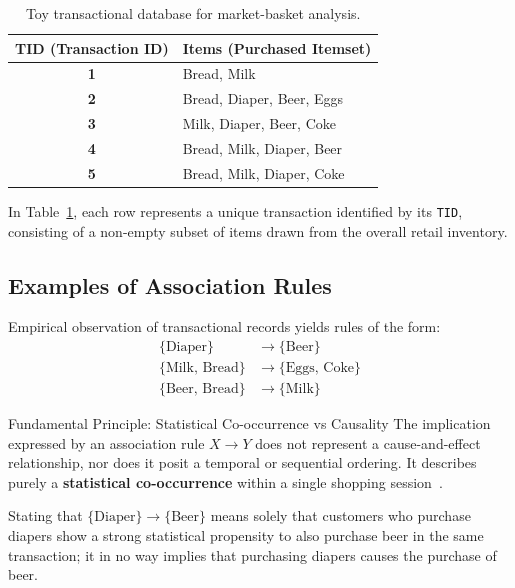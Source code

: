 \begin{table}[htbp]
\centering
\small
\renewcommand{\arraystretch}{1.2}
\begin{tabular}{c l}
\toprule
\textbf{TID (Transaction ID)} & \textbf{Items (Purchased Itemset)} \\
\midrule
\textbf{1} & Bread, Milk \\
\textbf{2} & Bread, Diaper, Beer, Eggs \\
\textbf{3} & Milk, Diaper, Beer, Coke \\
\textbf{4} & Bread, Milk, Diaper, Beer \\
\textbf{5} & Bread, Milk, Diaper, Coke \\
\bottomrule
\end{tabular}
\caption{Toy transactional database for market-basket analysis.}
\label{tab:dm-market-basket-toy-en}
\end{table}

In Table~\ref{tab:dm-market-basket-toy-en}, each row represents a unique transaction identified by its \texttt{TID}, consisting of a non-empty subset of items drawn from the overall retail inventory.

\subsection{Examples of Association Rules}
Empirical observation of transactional records yields rules of the form:
\begin{align}
\{\text{Diaper}\} &\longrightarrow \{\text{Beer}\} \label{eq:dm-toy-rule-1-en} \\
\{\text{Milk, Bread}\} &\longrightarrow \{\text{Eggs, Coke}\} \label{eq:dm-toy-rule-2-en} \\
\{\text{Beer, Bread}\} &\longrightarrow \{\text{Milk}\} \label{eq:dm-toy-rule-3-en}
\end{align}

\begin{noteblock}{Fundamental Principle: Statistical Co-occurrence vs Causality}
    The implication expressed by an association rule $X \rightarrow Y$ does not represent a cause-and-effect relationship, nor does it posit a temporal or sequential ordering. It describes purely a \textbf{statistical co-occurrence} within a single shopping session~\cite{tan2018}.
    
    Stating that $\{\text{Diaper}\} \rightarrow \{\text{Beer}\}$ means solely that customers who purchase diapers show a strong statistical propensity to also purchase beer in the same transaction; it in no way implies that purchasing diapers causes the purchase of beer.
\end{noteblock}

